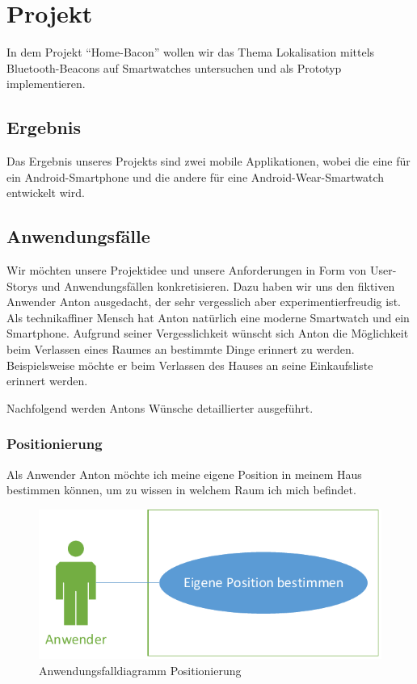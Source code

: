 \section{Projekt}

In dem Projekt "`Home-Bacon"' wollen wir das Thema Lokalisation mittels Bluetooth-Beacons auf Smartwatches untersuchen und als Prototyp implementieren.

\subsection{Ergebnis}
Das Ergebnis unseres Projekts sind zwei mobile Applikationen, wobei die eine für ein Android-Smartphone und die andere für eine Android-Wear-Smartwatch entwickelt wird.

\subsection{Anwendungsfälle}
Wir möchten unsere Projektidee und unsere Anforderungen in Form von User-Storys und Anwendungsfällen konkretisieren. Dazu haben wir uns den fiktiven Anwender Anton ausgedacht, der sehr vergesslich aber experimentierfreudig ist. Als technikaffiner Mensch hat Anton natürlich eine moderne Smartwatch und ein Smartphone. Aufgrund seiner Vergesslichkeit wünscht sich Anton die Möglichkeit beim Verlassen eines Raumes an bestimmte Dinge erinnert zu werden. Beispielsweise möchte er beim Verlassen des Hauses an seine Einkaufsliste erinnert werden.

Nachfolgend werden Antons Wünsche detaillierter ausgeführt.

\subsubsection{Positionierung}
Als Anwender Anton möchte ich meine eigene Position in meinem Haus bestimmen können, um zu wissen in welchem Raum ich mich befindet. 

\begin{figure}[H]
\centering
\includegraphics[width=0.7\linewidth]{Bilder/UseCase-Position}
\caption{Anwendungsfalldiagramm Positionierung}
\label{fig:UseCase-Position}
\end{figure}

